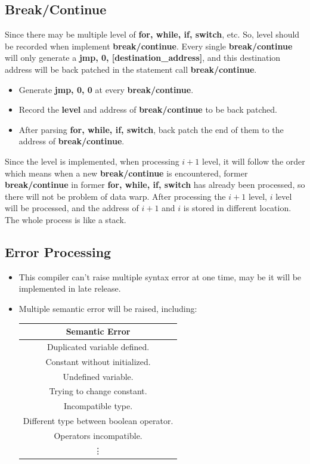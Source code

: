 \documentclass{article}
\begin{document}
		\subsection{Break/Continue}
		Since there may be multiple level of \textbf{for, while, if, switch}, etc. So, level should be recorded when implement \textbf{break/continue}. Every single \textbf{break/continue} will only generate a \textbf{jmp, 0, [destination\_address]}, and this destination address will be back patched in the statement call \textbf{break/continue}.
		\begin{itemize}
		\item Generate \textbf{jmp, 0, 0} at every \textbf{break/continue}.
		\item Record the \textbf{level} and address of \textbf{break/continue} to be back patched. 
		\item After parsing \textbf{for, while, if, switch}, back patch the end of them to the address of \textbf{break/continue}.
		\end{itemize}
		Since the level is implemented, when processing $ i+1 $ level, it will follow the order which means when a new \textbf{break/continue} is encountered, former \textbf{break/continue} in former \textbf{for, while, if, switch} has already been processed, so there will not be problem of data warp. After processing the $ i+1 $ level, $ i $ level will be processed, and the address of $ i+1 $ and $ i $ is stored in different location. The whole process is like a stack.\hypertarget{4.17}{}
		\subsection{Error Processing}
		\begin{itemize}
		\item This compiler can't raise multiple syntax error at one time, may be it will be implemented in late release.
		\item Multiple semantic error will be raised, including:\\
		\begin{center}
			\begin{tabular}{c}
			\toprule
			Semantic Error \\
			\midrule
			Duplicated variable defined.\\
			Constant without initialized.\\
			Undefined variable.\\
			Trying to change constant.\\
			Incompatible type.\\
			Different type between boolean operator.\\
			Operators incompatible.\\
			\vdots \\
			\bottomrule
			\end{tabular}
		\end{center}
		
		\end{itemize}
\end{document}
